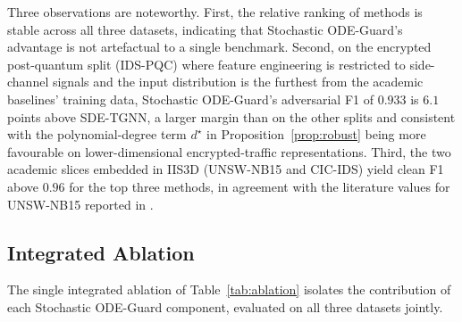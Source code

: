 \documentclass[journal,10pt]{IEEEtran}
\theoremstyle{definition}
\theoremstyle{remark}
\begin{document}
Three observations are noteworthy. First, the relative ranking of
methods is stable across all three datasets, indicating that
Stochastic ODE-Guard's advantage is not artefactual to a single
benchmark. Second, on the encrypted post-quantum split (IDS-PQC)
where feature engineering is restricted to side-channel signals
and the input distribution is the furthest from the academic baselines'
training data, Stochastic ODE-Guard's adversarial F1 of $0.933$ is
$6.1$ points above SDE-TGNN, a larger margin than on the other
splits and consistent with the polynomial-degree term $d^\star$
in Proposition~\ref{prop:robust} being more favourable on
lower-dimensional encrypted-traffic representations. Third, the
two academic slices embedded in IIS3D (UNSW-NB15 and CIC-IDS) yield
clean F1 above $0.96$ for the top three methods, in agreement with the
literature values for UNSW-NB15 reported in
\cite{lo2022egraphsage,wu2022rtids,mosaiyebzadeh2025graphmamba}.

\subsection{Integrated Ablation}\label{subsec:ablation}
The single integrated ablation of Table~\ref{tab:ablation} isolates
the contribution of each Stochastic ODE-Guard component, evaluated on
all three datasets jointly.
\end{document}
